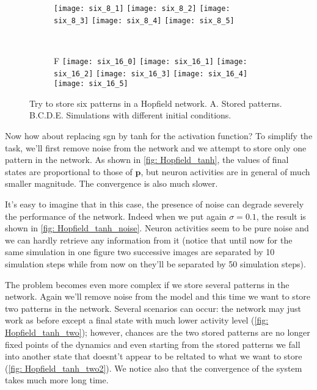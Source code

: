\begin{figure}[H]
\begin{subfigure}{\textwidth}
    \texttt{[image: six\_8\_1]}
    \texttt{[image: six\_8\_2]}
    \texttt{[image: six\_8\_3]}
    \texttt{[image: six\_8\_4]}
    \texttt{[image: six\_8\_5]}
  \end{subfigure}\\[0.8em]
  \begin{subfigure}{\textwidth}
    \textsf{F}
    \centering
    \texttt{[image: six\_16\_0]}
    \texttt{[image: six\_16\_1]}
    \texttt{[image: six\_16\_2]}
    \texttt{[image: six\_16\_3]}
    \texttt{[image: six\_16\_4]}
    \texttt{[image: six\_16\_5]}
  \end{subfigure}
  \vspace{1.2em}
  \caption{Try to store six patterns in a Hopfield network.
           \textsf{A.} Stored patterns.
           \textsf{B.C.D.E.} Simulations with different initial conditions.}
  \label{fig: Hopfield_six}
\end{figure}

\vfill

\newpage

Now how about replacing sgn by tanh for the activation function? To simplify
the task, we'll first remove noise from the network and we attempt to
store only one pattern in the network. As shown in 
\autoref{fig: Hopfield_tanh},
the values of final states are proportional to those of $\mathbf{p}$,
but neuron activities are in general of much smaller magnitude. The 
convergence is also much slower. 

It's easy to imagine that in this case, the presence of noise can degrade
severely the performance of the network. Indeed when we put again
$\sigma=0.1$, the result is shown in \autoref{fig: Hopfield_tanh_noise}. 
Neuron activities seem to be pure noise and we can hardly retrieve any
information from it (notice that until now for the same simulation in
one figure two successive images are separated by 10 simulation steps
while from now on they'll be separated by 50 simulation steps).

The problem becomes even more complex if we store several patterns in 
the network. Again we'll remove noise from the model and this time we want
to store two patterns in the network. Several scenarios can occur: the
network may just work as before except a final state with much lower 
activity level (\autoref{fig: Hopfield_tanh_two}); however, chances are
the two stored patterns are no longer fixed points of the dynamics and
even starting from the stored patterns we fall into another state that
doesnt't appear to be reltated to what we want to store 
(\autoref{fig: Hopfield_tanh_two2}). We notice also that the convergence
of the system takes much more long time.

